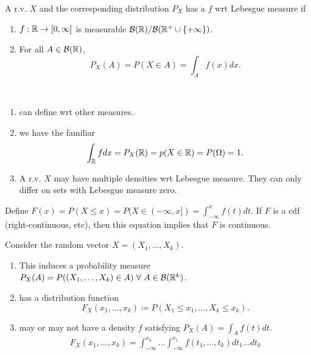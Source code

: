 \documentclass[class=article,crop=false]{standalone}
\begin{document}
\begin{defn}[density]
A r.v. $ X$ and the corresponding distribution  $ P_X$ has a   $ f$ wrt Lebesgue measure if 
 \begin{enumerate}[label=(\roman*)]
	 \item $ f: \mathbb{R} \to [0,\infty]$ is measurable $ \mathcal{B}(\mathbb{R}) / \mathcal{B}(\mathbb{R}^{+} \cup \{+ \infty\}) $.
	 \item For all $ A \in \mathcal{B}(\mathbb{R})$,
		 \[
			 P_X(A) = P(X \in A) = \int_A f(x) dx
		 .\] 
\end{enumerate}
\end{defn}

\begin{note}[]
~\begin{enumerate}[label=\arabic*)]
	\item can define wrt other measures.
	\item we have the familiar
		\[
			\int_{\mathbb{R}} f dx = P_X (\mathbb{R}) = p(X \in \mathbb{R}) = P(\Omega) = 1
		.\]
	\item A r.v. $ X$ may have multiple densities wrt Lebesgue measure. They can only differ on sets with Lebesgue measure zero.
\end{enumerate}
\end{note}

\begin{claim}
Define $ F(x) = P(X\leq x) = P(X \in (-\infty,x]) = \int_{-\infty}^x f(t) dt$. If $ F$ is a cdf (right-continuous, etc), then this equation implies that  $ F$ is continuous. 
\end{claim}

Consider the random vector $ X = (X_1,\ldots,X_k)$. 
\begin{enumerate}[label=\arabic*)]
	\item This induces a probability measure $ P_X(A) = P((X_1, \ldots, X_k) \in A) \ \forall \ A \in \mathcal{B}(\mathbb{R}^{k})$. 
	\item has a distribution function
		\[
			F_X(x_1,\ldots,x_k) \coloneqq P(X_1 \leq x_1, \ldots, X_k \leq x_k)
		.\]
	\item may or may not have a density $ f$ satisfying  $ P_X(A) = \int_A f(t) dt$.
		 \begin{align*}
			 F_X(x_1,\ldots,x_k) = \int_{-\infty}^{x_k} \ldots \int_{-\infty}^{x_1} f(t_1,\ldots,t_k) dt_1 \ldots dt_k
		\end{align*}
\end{enumerate}
\end{document}
